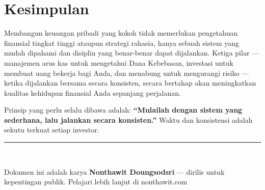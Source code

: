 \documentclass[10pt,a4paper,twocolumn]{article}
\begin{document}
\section{Kesimpulan}
Membangun keuangan pribadi yang kokoh tidak memerlukan pengetahuan finansial tingkat tinggi ataupun strategi rahasia, hanya sebuah sistem yang mudah dipahami dan disiplin yang benar-benar dapat dijalankan. Ketiga pilar --- manajemen arus kas untuk mengetahui Dana Kebebasan, investasi untuk membuat uang bekerja bagi Anda, dan menabung untuk mengurangi risiko --- ketika dijalankan bersama secara konsisten, secara bertahap akan meningkatkan kualitas kehidupan finansial Anda sepanjang perjalanan.

Prinsip yang perlu selalu dibawa adalah: \textbf{``Mulailah dengan sistem yang sederhana, lalu jalankan secara konsisten.''} Waktu dan konsistensi adalah sekutu terkuat setiap investor.

\vspace{1em}
\noindent\rule{\linewidth}{0.4pt}\\
{\small\raggedright Dokumen ini adalah karya \textbf{Nonthawit Doungsodsri} --- dirilis untuk kepentingan publik. Pelajari lebih lanjut di nonthawit.com\par}
\end{document}

